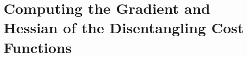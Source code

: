 \documentclass[encoding=utf8,british]{template/thesis}
\begin{document}
	\chapter{Computing the Gradient and Hessian of the Disentangling Cost Functions}
	\label{app:computation_of_gradient_and_hvp_for_riemannian_optimization}
		
	
	\backmatter
	\printbibliography
	
\end{document}
